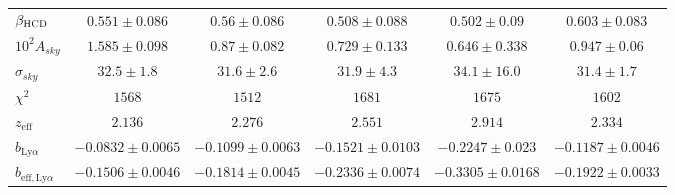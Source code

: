 \documentclass[11pt, twoside, a4paper, openright]{report}
\begin{document}
\begin{table}[]
\begin{tabular}{lccccc}
$\beta_{\textsc{HCD}} $ & $ 0.551 \pm 0.086$ & $ 0.56 \pm 0.086$ & $ 0.508 \pm 0.088$ & $ 0.502 \pm 0.09$ & $ 0.603 \pm 0.083$ \\
$10^2 A_{sky} $ & $ 1.585 \pm 0.098$ & $ 0.87 \pm 0.082$ & $ 0.729 \pm 0.133$ & $ 0.646 \pm 0.338$ & $ 0.947 \pm 0.06$ \\
$\sigma_{sky} $ & $ 32.5 \pm 1.8$ & $ 31.6 \pm 2.6$ & $ 31.9 \pm 4.3$ & $ 34.1 \pm 16.0$ & $ 31.4 \pm 1.7$ \\
\midrule
$\chi^2$ & $ 1568 $ & $ 1512 $ & $ 1681 $ & $ 1675 $ & $ 1602 $ \\
$z_{\mathrm{eff}}$ & $ 2.136 $ & $ 2.276 $ & $ 2.551 $ & $ 2.914 $ & $ 2.334 $ \\
\midrule
$b_{\mathrm{Ly}\alpha} $ & $ -0.0832 \pm 0.0065$ & $ -0.1099 \pm 0.0063$ & $ -0.1521 \pm 0.0103$ & $ -0.2247 \pm 0.023$ & $ -0.1187 \pm 0.0046$ \\
$b_{\mathrm{eff}, \mathrm{Ly}\alpha} $ & $ -0.1506 \pm 0.0046$ & $ -0.1814 \pm 0.0045$ & $ -0.2336 \pm 0.0074$ & $ -0.3305 \pm 0.0168$ & $ -0.1922 \pm 0.0033$ \\
\bottomrule
\end{tabular}
\end{table}
\end{document}
